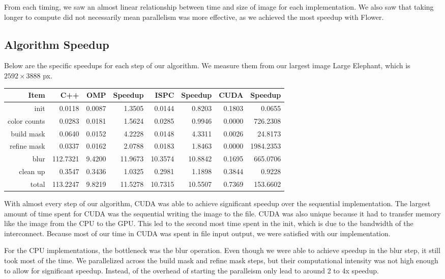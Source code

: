 \documentclass[12pt]{article}
\begin{document}
From each timing, we saw an almost linear relationship between time and size
of image for each implementation. We also saw that taking longer to compute
did not necessarily mean parallelism was more effective, as we achieved the
most speedup with Flower.

\subsection{Algorithm Speedup}

Below are the specific speedups for each step of our algorithm. We measure them
from our largest image Large Elephant, which is $2592 \times 3888$ px.

\begin{tabular}{r|r|r|r|r|r|r|r}
    Item & C++ & OMP & Speedup & ISPC & Speedup & CUDA & Speedup
\\  \hline
    init & 0.0118 & 0.0087 & 1.3505 & 0.0144 & 0.8203 & 0.1803 & 0.0655
\\  color counts & 0.0283 & 0.0181 & 1.5624 & 0.0285 & 0.9946 & 0.0000 & 726.2308
\\  build mask & 0.0640 & 0.0152 & 4.2228 & 0.0148 & 4.3311 & 0.0026 & 24.8173
\\  refine mask & 0.0337 & 0.0162 & 2.0788 & 0.0183 & 1.8463 & 0.0000 & 1984.2353
\\  blur & 112.7321 & 9.4200 & 11.9673 & 10.3574 & 10.8842 & 0.1695 & 665.0706
\\  clean up & 0.3547 & 0.3436 & 1.0325 & 0.2981 & 1.1898 & 0.3844 & 0.9228
\\  \hline
    total & 113.2247 & 9.8219 & 11.5278 & 10.7315 & 10.5507 & 0.7369 & 153.6602
\end{tabular}

With almost every step of our algorithm, CUDA was able to achieve significant
speedup over the sequential implementation. The largest amount of time spent
for CUDA was the sequential writing the image to the file. CUDA was also
unique because it had to transfer memory like the image from the CPU to the GPU.
This led to the second most time spent in the init, which is due to the
bandwidth of the interconnect. Because most of our time in CUDA was spent in
file input output, we were satisfied with our implementation.

For the CPU implementations, the bottleneck was the blur operation. Even though
we were able to achieve speedup in the blur step, it still took most of the
time. We parallelized across the build mask and refine mask steps, but their
computational intensity was not high enough to allow for significant speedup.
Instead, of the overhead of starting the paralleism only lead to around 2 to 4x
speedup.
\end{document}
